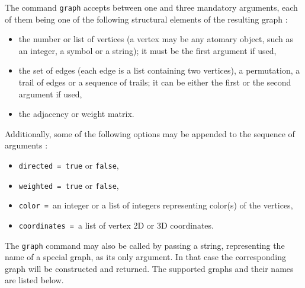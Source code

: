 \documentclass[a4paper,11pt]{article}
\begin{document}
The command {\tt graph} accepts between one and three mandatory arguments, each of them being one of the following structural elements of the resulting graph :
\begin{itemize}
  \item the number or list of vertices (a vertex may be any atomary object, such as an integer, a symbol or a string); it must be the first argument if used,
  \item the set of edges (each edge is a list containing two vertices), a permutation, a trail of edges or a sequence of trails; it can be either the first or the second argument if used,
  \item the adjacency or weight matrix.
\end{itemize}
Additionally, some of the following options may be appended to the sequence of arguments :
\begin{itemize}
  \item {\tt directed = true} or {\tt false},
  \item {\tt weighted = true} or {\tt false},
  \item {\tt color = }an integer or a list of integers representing color(s) of the vertices,
  \item {\tt coordinates = }a list of vertex 2D or 3D coordinates.
\end{itemize}
The {\tt graph} command may also be called by passing a string, representing the name of a special graph, as its only argument. In that case the corresponding graph will be constructed and returned. The supported graphs and their names are listed below.
\end{document}
